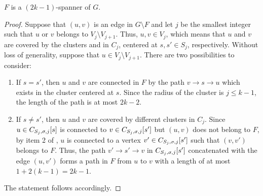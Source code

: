 \begin{lemma} \label{lem:app_spanner}
\( F \) is a \( (2k - 1) \)-spanner of \( G \).
\end{lemma}
\begin{proof}
Suppose that \( (u, v) \) is an edge in \( G \setminus F \) and let \( j \) be the smallest integer such that \( u \) or \( v \) belongs to \( V_j \setminus V_{j+1} \).
Thus, \( u, v \in V_j \), which means that \( u \) and \( v \) are covered by the clusters  and  in \( C_j \), centered at \( s, s' \in S_j \), respectively.
Without loss of generality, suppose that \( u \in V_j \setminus V_{j+1} \).
There are two possibilities to consider:
\begin{enumerate}
\item 
If \( s = s' \), then \( u \) and \( v \) are connected in \( F \) by the path \( v \to s \to u \) which exists in the cluster  centered at \( s \).
Since the radius of the cluster is \( j \leq k - 1 \), the length of the path is at most \( 2k - 2 \).

\item
If \( s \neq s' \), then \( u \) and \( v \) are covered by different clusters in \( C_j \).
Since \( u \in C_{S_j, \sigma, j} [s] \) is connected to \( v \in C_{S_j, \sigma, j} [s'] \) but \( (u, v) \) does not belong to \( F \), by item 2 of , \( u \) is connected to a vertex \( v' \in C_{S_j, \sigma, j} [s'] \) such that \( (v, v') \) belongs to \( F \).
Thus, the path \( v' \to s' \to v  \) in \( C_{S_j, \sigma, j} [s'] \) concatenated with the edge \( (u, v') \) forms a path in \( F \) from \( u \) to \( v \) with a length of at most \( 1 + 2(k - 1) = 2k - 1 \).
\end{enumerate}
The statement follows accordingly.
\end{proof}


